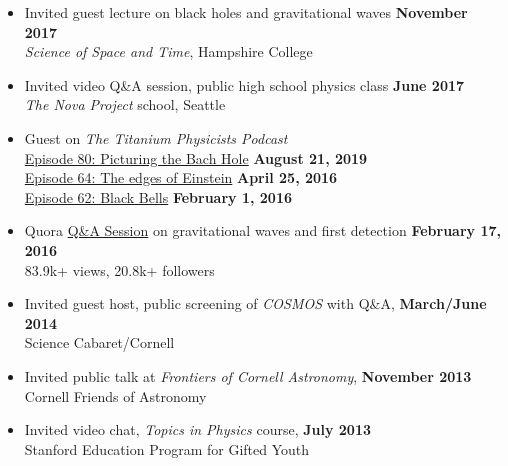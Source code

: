 \documentclass[margin,line]{res}
\begin{document}
\begin{resume}
\begin{itemize}
\item[] Invited guest lecture on black holes and gravitational waves \hfill {\bf November 2017} \\
\hspace*{1em} {\it Science of Space and Time}, Hampshire College

\item[] Invited video Q\&A session, public high school physics class \hfill {\bf June 2017} \\
\hspace*{1em} {\it The Nova Project} school, Seattle

\item[] Guest on {\it The Titanium Physicists Podcast} \\
\hspace*{1em}
\href{http://titaniumphysicists.brachiolopemedia.com/2019/08/21/episode-80-picturing-the-bach-hole-with-adal-rifai/}{Episode
  80: Picturing the Bach Hole}
\hfill
{\bf August 21, 2019} \\
\hspace*{1em} \href{http://titaniumphysicists.brachiolopemedia.com/2016/04/25/episode-64-e-and-n-the-edges-of-einstein/}{Episode 64: The edges of Einstein}
\hfill
{\bf April 25, 2016} \\
\hspace*{1em} \href{http://titaniumphysicists.brachiolopemedia.com/2016/02/01/episode-62-black-bells-with-brent-knopf-and-matt-sheehy/}{Episode 62: Black Bells}
\hfill
{\bf February 1, 2016} \\

\item[] Quora \href{https://www.quora.com/session/Leo-C-Stein/1}{Q\&A Session} on gravitational waves and first detection
  \hfill {\bf February 17, 2016} \\
\hspace*{1em} 83.9k+ views, 20.8k+ followers

\item[] Invited guest host, public screening of {\it COSMOS} with Q\&A,
  \hfill {\bf March/June 2014} \\
\hspace*{1em} Science Cabaret/Cornell
\item[] Invited public talk at {\it Frontiers of Cornell Astronomy}, \hfill {\bf November 2013} \\
\hspace*{1em} Cornell Friends of Astronomy
\item[] Invited video chat, {\it Topics in Physics} course, \hfill {\bf July 2013} \\
\hspace*{1em} Stanford Education Program for Gifted Youth
\end{itemize}


\end{resume}
\end{document}
